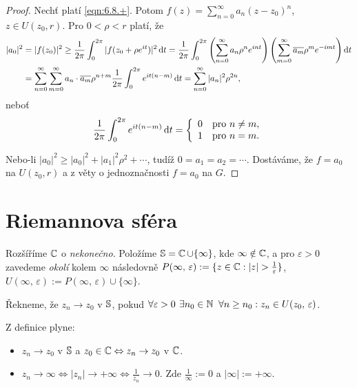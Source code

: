 \begin{proof}
Nechť platí \cref{eqn:6.8.+}. Potom $f(z)=\sum\limits_{n=0}^\infty a_n(z-z_0)^{n}$, $z\in U(z_0,r)$. Pro $0<\rho<r$ platí, že 
\begin{equation}
    \begin{aligned}
    |a_0|^2 &=
    |f(z_0)|^2 \geq 
    \frac{1}{2 \pi} \int_{0}^{2 \pi} |f(z_0+\rho e^{it})|^2 \mathop{}\!\mathrm{d} t =
    \frac{1}{2\pi} \int_{0}^{2 \pi} \left(\sum\limits_{n=0}^\infty a_n \rho^n e^{int}\right)\left(\sum\limits_{m=0}^\infty \overline{a_m} \rho^m e^{-imt}\right) \mathop{}\!\mathrm{d} t  \\
    & = \sum\limits_{n=0}^\infty \sum\limits_{m=0}^\infty a_n\cdot \overline{a_m} \rho^{n+m} \frac{1}{2 \pi} \int_{0}^{2 \pi}  e^{it(n-m)} \mathop{}\!\mathrm{d} t=\sum\limits_{n=0}^\infty |a_n|^2\rho^{2n},
    \end{aligned}
\end{equation}
 neboť
 $$\frac{1}{2 \pi} \int_{0}^{2 \pi}  e^{it(n-m)} \mathop{}\!\mathrm{d} t = \left\{ \begin{array}{ll} 0 & \mbox{pro } n \neq m, \\ 1 & \mbox{pro } n = m. \end{array} \right.$$ 

Nebo-li $|a_0|^2\geq|a_0|^2+|a_1|^2\rho^2+\cdots$, tudíž $0=a_1=a_2=\cdots$. Dostáváme, že $f=a_0$ na $U(z_0,r)$ a z věty o jednoznačnosti $f=a_0$ na $G$.
\end{proof}

\section{\texorpdfstring{Riemannova sféra}{Riemannova sféra}} \setcounter{equation}{0}
Rozšíříme $\operatorname{\mathbb{C}}  $ o \emph{nekonečno}.
Položíme $\operatorname{\mathbb{S}}=\operatorname{\mathbb{C}}  \cup\{\infty\}$, kde $\infty\notin\operatorname{\mathbb{C}}  $, a pro $\varepsilon>0$ zavedeme \emph{okolí} kolem $\infty$ následovně $P(\infty,\,\varepsilon):=\{z\in\Comp  : |z|>\frac{1}{\varepsilon}\}$,
$U(\infty,\,\varepsilon):=P(\infty,\,\varepsilon)\cup \{\infty\}$.

\begin{definition}
Řekneme, že $z_n\rightarrow z_0$ v $\operatorname{\mathbb{S}}$, pokud $\forall\varepsilon>0\textbf{ }  \exists n_0\in\operatorname{\mathbb{N}}\textbf{ }\forall n\geq n_0:z_n\in U(z_0,\,\varepsilon)$.
\end{definition}

\begin{note} Z definice plyne:
\begin{itemize}
    \item $z_n\rightarrow z_0$ v $\operatorname{\mathbb{S}}$ a $z_0\in\operatorname{\mathbb{C}}  \Leftrightarrow z_n\rightarrow z_0$ v $\operatorname{\mathbb{C}}  $.
    \item $z_n\rightarrow\infty\Leftrightarrow|z_n|\rightarrow+\infty\Leftrightarrow\frac{1}{z_n}\rightarrow 0$. Zde $\frac{1}{\infty}:=0$ a $|\infty|:=+\infty$.
\end{itemize}
\end{note}

